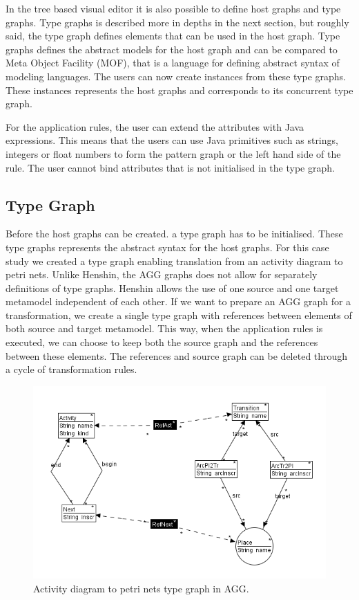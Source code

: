 \documentclass[pdftex,11pt,a4paper]{article}
\begin{document}
\indent In the tree based visual editor it is also possible to define host
graphs and type graphs. Type graphs is described more in depths in the next
section, but roughly said, the type graph defines elements that can be used in
the host graph. Type graphs defines the abstract models for the host graph and
can be compared to Meta Object Facility (MOF)\cite{MOF}, that is a language for
defining abstract syntax of modeling languages. The users can now create instances
from these type graphs. These instances represents the host graphs and
corresponds to its concurrent type graph. 

\indent For the application rules, the user can extend the attributes with Java
expressions. This means that the users can use Java primitives such as strings,
integers or float numbers to form the pattern graph or the left hand side of the
rule. The user cannot bind attributes that is not initialised in the type graph. 

\subsection{Type Graph}

\noindent Before the host graphs can be created. a type graph has to be
initialised. These type graphs represents the abstract syntax for the host
graphs. For this case study we created a type graph enabling translation from
an activity diagram to petri nets. Unlike Henshin, the AGG graphs does not
allow for separately definitions of type graphs. Henshin allows the use of one
source and one target metamodel independent of each other. If we want to
prepare an AGG graph for a transformation, we create a single type graph with
references between elements of both source and target metamodel. This way, when
the application rules is executed, we can choose to keep both the source graph
and the references between these elements. The references and source graph can
be deleted through a cycle of transformation rules.

\begin{figure}[H]
	\centering
	\includegraphics[scale=0.7]{figures/AggTypeGraph.png}
	\caption{Activity diagram to petri nets type graph in AGG.}
	\label{fig:AggTypeGraph}
\end{figure}
\end{document}
